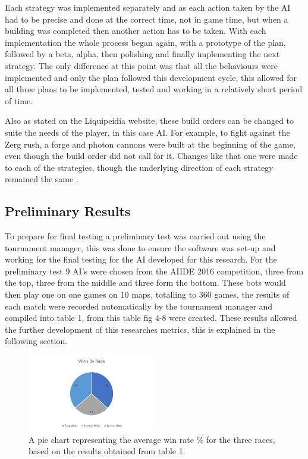\documentclass[journal]{IEEEtran}
\begin{document}
Each strategy was implemented separately and as each action taken by the AI had to be precise and done at the correct time, not in game time, but when a building was completed then another action has to be taken. With each implementation the whole process began again, with a prototype of the plan, followed by a beta, alpha, then polishing and finally implementing the next strategy. The only difference at this point was that all the behaviours were implemented and only the plan followed this development cycle, this allowed for all three plans to be implemented, tested and working in a relatively short period of time.

Also as stated on the Liquipeidia website, these build orders can be changed to suite the needs of the player, in this case AI. For example, to fight against the Zerg rush, a forge and photon cannons were built at the beginning of the game, even though the build order did not call for it. Changes like that one were made to each of the strategies, though the underlying direction of each strategy remained the same \cite{Alter}.

\subsection{Preliminary Results}
To prepare for final testing a preliminary test was carried out using the tournament manager, this was done to ensure the software was set-up and working for the final testing for the AI developed for this research. For the preliminary test 9 AI's were chosen from the AIIDE 2016 competition, three from the top, three from the middle and three form the bottom. These bots would then play one on one games on 10 maps, totalling to 360 games, the results of each match were recorded automatically by the tournament manager and compiled into table 1, from this table fig 4-8 were created. These results allowed the further development of this researches metrics, this is explained in the following section.

\begin{figure}[H]
	\centering
	\includegraphics[width=0.5\textwidth]{RacePie}
	\caption{A pie chart representing the average win rate \% for the three races, based on the results obtained from table 1.}
	\label{Fig4}
\end{figure}
\end{document}
